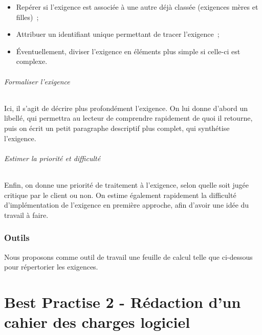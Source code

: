 \documentclass[a4paper]{article}
\begin{document}
\begin{itemize}
\item Repérer si l’exigence est associée à une autre déjà classée (exigences mères et filles) ;
\item Attribuer un identifiant unique permettant de tracer l’exigence ;
\item Éventuellement, diviser l’exigence en éléments plus simple si celle-ci est complexe.
\end{itemize}

\paragraph{Formaliser l’exigence}
Ici, il s’agit de décrire plus profondément l’exigence. On lui donne d’abord un libellé, qui permettra au lecteur de comprendre rapidement de quoi il retourne, puis on écrit un petit paragraphe descriptif plus complet, qui synthétise l’exigence.


\paragraph{Estimer la priorité et difficulté}
Enfin, on donne une priorité de traitement à l’exigence, selon quelle soit jugée critique par le client ou non.  On estime également rapidement la difficulté d’implémentation de l’exigence en première approche, afin d’avoir une idée du travail à faire.

\section{Outils}

Nous proposons comme outil de travail une feuille de calcul telle que ci-dessous pour répertorier les exigences.

\part{Best Practise 2 - Rédaction d'un cahier des charges logiciel}
\end{document}
